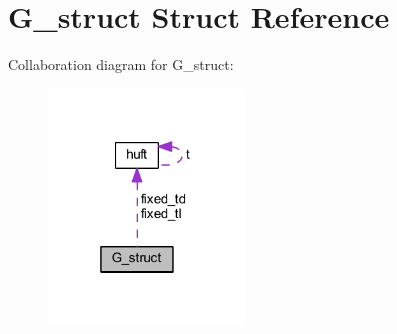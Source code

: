 \hypertarget{struct_g__struct}{}\section{G\+\_\+struct Struct Reference}
\label{struct_g__struct}


Collaboration diagram for G\+\_\+struct\+:
\nopagebreak
\begin{figure}[H]
\begin{center}
\leavevmode
\includegraphics[width=148pt]{struct_g__struct__coll__graph}
\end{center}
\end{figure}
